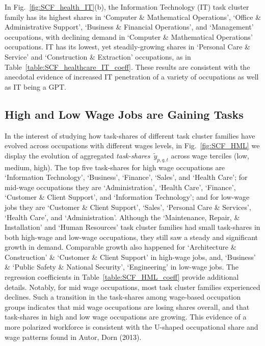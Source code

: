 \documentclass[letterpaper]{article} %
\begin{document}
In Fig.~\ref{fig:SCF_health_IT}(b), the Information Technology (IT) task cluster family has its highest shares in `Computer \& Mathematical Operations', `Office \& Administrative Support', `Business \& Financial Operations', and `Management' occupations, with declining demand in `Computer \& Mathematical Operations' occupations. IT has its lowest, yet steadily-growing shares in `Personal Care \& Service' and `Construction \& Extraction' occupations, as in Table~\ref{table:SCF_healthcare_IT_coeff}. These results are consistent with the anecdotal evidence of increased IT penetration of a variety of occupations as well as IT being a GPT.

\subsection{High and Low Wage Jobs are Gaining Tasks}
\label{subsec:mid_wage}
In the interest of studying how task-shares of different task cluster families have evolved across occupations with different wages levels, in Fig.~\ref{fig:SCF_HML} we display the evolution of aggregated \emph{task-shares}~$\tilde{y}_{p,q,t}$ across wage terciles (low, medium, high). The top five task-shares for high wage occupations are `Information Technology', `Business', `Finance', `Sales', and `Health Care'; for mid-wage occupations they are `Administration', `Health Care', `Finance', `Customer \& Client Support', and `Information Technology'; and for low-wage jobs they are `Customer \& Client Support', `Sales', `Personal Care \& Services', `Health Care', and `Administration'. Although the `Maintenance, Repair, \& Installation' and `Human Resources' task cluster families had small task-shares in both high-wage and low-wage occupations, they still saw a steady and significant growth in demand. Comparable growth also happened for `Architecture \& Construction' \& `Customer \& Client Support' in high-wage jobs, and, `Business' \& `Public Safety \& National Security', `Engineering' in low-wage jobs. The regression coefficients in Table~\ref{table:SCF_HML_coeff} provide additional details. Notably, for mid wage occupations, most task cluster families experienced declines. Such a transition in the task-shares among wage-based occupation groups indicates that mid wage occupations are losing shares overall, and that task-shares in high and low wage occupations are growing. This evidence of a more polarized workforce is consistent with the U-shaped occupational share and wage patterns found in Autor, Dorn (2013).
\end{document}
